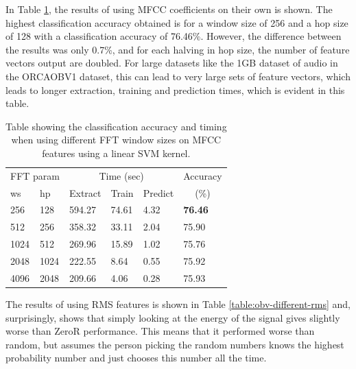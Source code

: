 \documentclass[12pt,oneside]{book}
\begin{document}
In Table \ref{table:obv-different-mfcc}, the results of using MFCC
coefficients on their own is shown.  The highest classification
accuracy obtained is for a window size of 256 and a hop size of 128
with a classification accuracy of 76.46\%.  However, the difference
between the results was only 0.7\%, and for each halving in hop size,
the number of feature vectors output are doubled.  For large datasets
like the 1GB dataset of audio in the ORCAOBV1 dataset, this can lead to
very large sets of feature vectors, which leads to longer extraction,
training and prediction times, which is evident in this table.


\begin{table}
\begin{tabular}{|l|l|l|l|l|l|}
\hline
\multicolumn{2}{|c|}{FFT param} & \multicolumn{3}{c|}{Time (sec)} & Accuracy \\
\hhline{|-|-|-|-|-|~|}
ws & hp & Extract & Train & Predict & \multicolumn{1}{c|}{(\%)} \\
\hhline{|=|=|=|=|=|=|}
256 & 128    &   594.27  &   74.61  &   4.32  &  \textbf{76.46}  \\
512 & 256    &   358.32  &   33.11  &   2.04  &  75.90  \\
1024 & 512   &   269.96  &   15.89  &   1.02  &  75.76  \\
2048 & 1024  &   222.55  &    8.64  &   0.55  &  75.92  \\
4096 & 2048  &   209.66  &    4.06  &   0.28  &  75.93  \\
\hline
\end{tabular}
\caption{Table showing the classification accuracy and timing when
  using different FFT window sizes on MFCC features using a linear SVM
  kernel.}
\label{table:obv-different-mfcc}
\end{table}

The results of using RMS features is shown in Table
\ref{table:obv-different-rms} and, surprisingly, shows that simply
looking at the energy of the signal gives slightly worse than ZeroR
performance.  This means that it performed worse than random, but
assumes the person picking the random numbers knows the highest
probability number and just chooses this number all the time.
\end{document}
